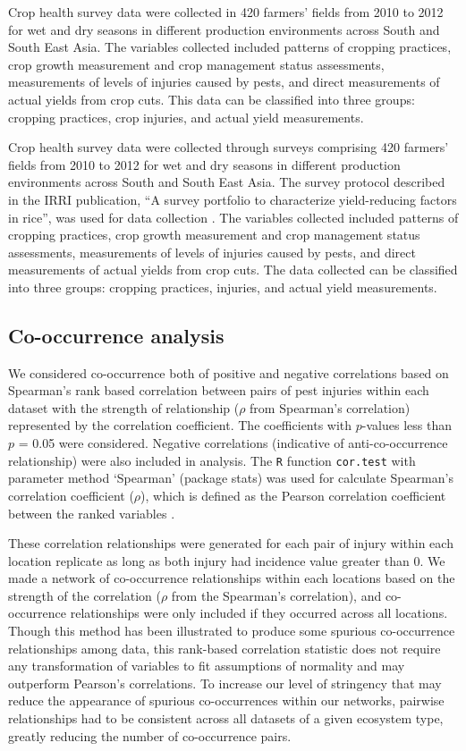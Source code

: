 \documentclass{frontiersSCNS} %
\begin{document}
\begin{methods}
Crop health survey data were collected in 420 farmers' fields from 2010 to 2012 for wet and dry seasons in different production environments across South and South East Asia. The variables collected included patterns of cropping practices, crop growth measurement and crop management status assessments, measurements of levels of injuries caused by pests, and direct measurements of actual yields from crop cuts. This data can be classified into three groups: cropping practices, crop injuries, and actual yield measurements.

Crop health survey data were collected through surveys comprising 420 farmers' fields from 2010 to 2012 for wet and dry seasons in different production environments across South and South East Asia. The survey protocol described in the IRRI publication, ``A survey portfolio to characterize yield-reducing factors in rice'', was used for data collection \citep{Savarysurvey2009}. The variables collected included patterns of cropping practices, crop growth measurement and crop management status assessments, measurements of levels of injuries caused by pests, and direct measurements of actual yields from crop cuts. The data collected can be classified into three groups: cropping practices, injuries, and actual yield measurements.

\subsection*{Co-occurrence analysis}

We considered co-occurrence both of positive and negative correlations based on Spearman's rank based correlation between pairs of pest injuries within each dataset with the strength of relationship ($\rho$ from Spearman's correlation) represented by the correlation coefficient. The coefficients with $p$-values less than $p$ = 0.05 were considered. Negative correlations (indicative of anti-co-occurrence relationship) were also included in analysis. The \texttt{R} function \texttt{cor.test} with parameter method `Spearman' (package stats) was used for calculate Spearman's correlation coefficient ($\rho$), which is defined as the Pearson correlation coefficient between the ranked variables \citep{R_2015}.

These correlation relationships were generated for each pair of injury within each location replicate as long as both injury had incidence value greater than 0. We made a network of co-occurrence relationships within each locations based on the strength of the correlation ($\rho$ from the Spearman's correlation), and co-occurrence relationships were only included if they occurred across all locations. Though this method has been illustrated to produce some spurious co-occurrence relationships among data, this rank-based correlation statistic does not require any transformation of variables to fit assumptions of normality and may outperform Pearson’s correlations. To increase our level of stringency that may reduce the appearance of spurious co-occurrences within our networks, pairwise relationships had to be consistent across all datasets of a given ecosystem type, greatly reducing the number of co-occurrence pairs.


\end{methods}
\end{document}
